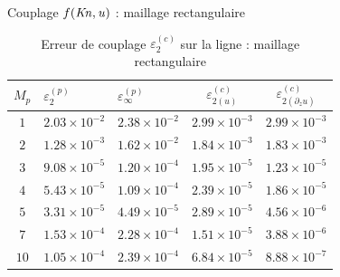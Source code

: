 \documentclass[aspect ratio=169,t]{beamer}
\numberwithin{equation}{section} %
\begin{document}
\begin{frame}{Couplage $f(\it Kn,u)$ : maillage rectangulaire}

\begin{table}[!ht]
    \centering
    \begin{tabular}{c|ll|cc}
    \hline
    $M_p$ & $\varepsilon_{2}^{(p)}$ & $\varepsilon_{\infty}^{(p)}$ &$\varepsilon_{2 {(u)}}^{(c)}$&$\varepsilon_{2 {(\partial_z u)}}^{(c)}$ \\
    \hline
    $1$ & $2.03\times 10^{-2}$ & $2.38\times 10^{-2}$ &  $2.99\times 10^{-3}$  & $2.99\times 10^{-3}$ \\
    $2$ & $1.28\times 10^{-3}$ & $1.62\times 10^{-2}$ &  $1.84\times 10^{-3}$  & $1.83\times 10^{-3}$ \\
    $3$ & $9.08\times 10^{-5}$ & $1.20\times 10^{-4}$ &  $1.95\times 10^{-5}$  & $1.23\times 10^{-5}$ \\
    $4$ & $5.43\times 10^{-5}$ & $1.09\times 10^{-4}$ &  $2.39\times 10^{-5}$  & $1.86\times 10^{-5}$ \\
    $5$ & $3.31\times 10^{-5}$ & $4.49\times 10^{-5}$ &  $2.89\times 10^{-5}$  & $4.56\times 10^{-6}$ \\
    $7$ & $1.53\times 10^{-4}$ & $2.28\times 10^{-4}$ &  $1.51\times 10^{-5}$  & $3.88\times 10^{-6}$ \\
    $10$ & $1.05\times 10^{-4}$ & $2.39\times 10^{-4}$ &  $6.84\times 10^{-5}$  & $8.88\times 10^{-7}$ \\
    \hline
    \end{tabular}
    \caption{Erreur de couplage $\varepsilon_{2}^{(c)}$ sur la ligne : maillage rectangulaire}
    \label{tab:ml_slip_coupling_knuh_rectangle}
\end{table}
    
\end{frame}
\end{document}
